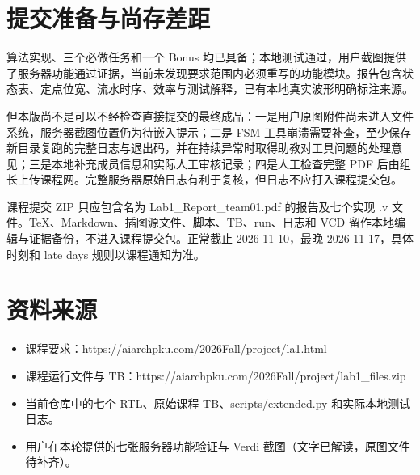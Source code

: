 \documentclass[
  10pt,
  a4paper,
]{article}
\providecommand{\tightlist}{%
  \setlength{\itemsep}{0pt}\setlength{\parskip}{0pt}}
\begin{document}
\section{提交准备与尚存差距}\label{ux63d0ux4ea4ux51c6ux5907ux4e0eux5c1aux5b58ux5deeux8ddd}

算法实现、三个必做任务和一个 Bonus
均已具备；本地测试通过，用户截图提供了服务器功能通过证据，当前未发现要求范围内必须重写的功能模块。报告包含状态表、定点位宽、流水时序、效率与测试解释，已有本地真实波形明确标注来源。

但本版尚不是可以不经检查直接提交的最终成品：一是用户原图附件尚未进入文件系统，服务器截图位置仍为待嵌入提示；二是
FSM
工具崩溃需要补查，至少保存新目录复跑的完整日志与退出码，并在持续异常时取得助教对工具问题的处理意见；三是本地补充成员信息和实际人工审核记录；四是人工检查完整
PDF
后由组长上传课程网。完整服务器原始日志有利于复核，但日志不应打入课程提交包。

课程提交 ZIP 只应包含名为 Lab1\_Report\_team01.pdf 的报告及七个实现 .v
文件。TeX、Markdown、插图源文件、脚本、TB、run、日志和 VCD
留作本地编辑与证据备份，不进入课程提交包。正常截止 2026-11-10，最晚
2026-11-17，具体时刻和 late days 规则以课程通知为准。

\section{资料来源}\label{ux8d44ux6599ux6765ux6e90}

\begin{itemize}
\tightlist
\item
  课程要求：https://aiarchpku.com/2026Fall/project/la1.html
\item
  课程运行文件与
  TB：https://aiarchpku.com/2026Fall/project/lab1\_files.zip
\item
  当前仓库中的七个 RTL、原始课程 TB、scripts/extended.py
  和实际本地测试日志。
\item
  用户在本轮提供的七张服务器功能验证与 Verdi
  截图（文字已解读，原图文件待补齐）。
\end{itemize}
\end{document}
